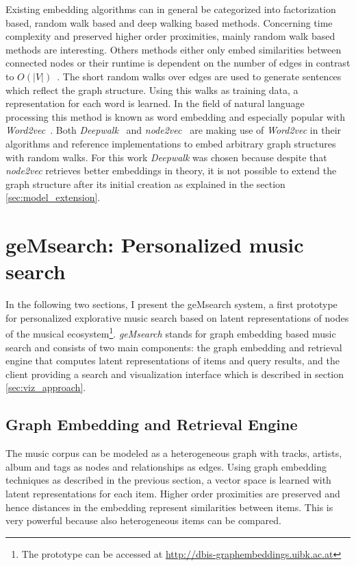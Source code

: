 \documentclass[sigconf]{acmart}
\begin{document}
Existing embedding algorithms can in general be categorized into factorization based, random walk based and deep walking based methods. Concerning time complexity and preserved higher order proximities, mainly random walk based methods are interesting. Others methods either only embed similarities between connected nodes or their runtime is dependent on the number of edges in contrast to $ O(|V|) $~\cite{goyal2017graph}. The short random walks over edges are used to generate sentences which reflect the graph structure. Using this walks as training data, a representation for each word is learned. In the field of natural language processing this method is known as word embedding and especially popular with \emph{Word2vec}~\cite{mikolov2013efficient}. Both \emph{Deepwalk}~\cite{perozzi2014deepwalk} and \emph{node2vec}~\cite{grover2016node2vec} are making use of \emph{Word2vec} in their algorithms and reference implementations to embed arbitrary graph structures with random walks. For this work \emph{Deepwalk} was chosen because despite that \emph{node2vec} retrieves better embeddings in theory, it is not possible to extend the graph structure after its initial creation as explained in the section \ref{sec:model_extension}.

\section{geMsearch: Personalized music search}
\label{sec:gemsearch}
In the following two sections, I present the geMsearch system, a first prototype for personalized explorative music search based on latent representations of nodes of the musical ecosystem\footnote{The prototype can be accessed at \url{http://dbis-graphembeddings.uibk.ac.at}}.
\emph{geMsearch} stands for graph embedding based music search and consists of two main components: the graph embedding and retrieval engine that computes latent representations of items and query results, and the client providing a search and visualization interface which is described in section \ref{sec:viz_approach}. 


\subsection{Graph Embedding and Retrieval Engine}

The music corpus can be modeled as a heterogeneous graph with tracks, artists, album and tags as nodes and relationships as edges. Using graph embedding techniques as described in the previous section, a vector space is learned with latent representations for each item. Higher order proximities are preserved and hence distances in the embedding represent similarities between items. This is very powerful because also heterogeneous items can be compared. 
\end{document}
